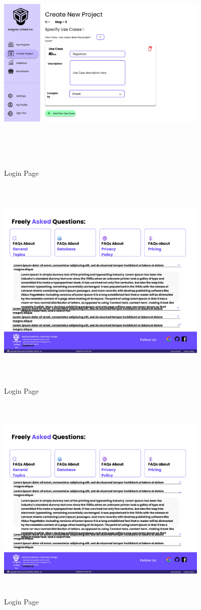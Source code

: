 \begin{figure}[H]
\includegraphics[height=10cm, width=0.9\textwidth]{./images/prototype/0017}
\centering 
\caption{Login Page}
\label{fig:prototype1}


\pagebreak

\includegraphics[height=10cm, width=0.9\textwidth]{./images/prototype/0018}
\centering 
\caption{Login Page}
\label{fig:prototype1}

\includegraphics[height=10cm, width=0.9\textwidth]{./images/prototype/0019}
\centering 
\caption{Login Page}
\label{fig:prototype1}



\end{figure}
